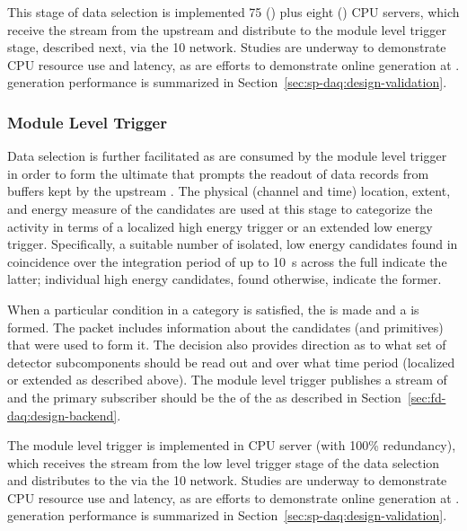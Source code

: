 This stage of data selection is implemented \num{75} () plus eight
() CPU servers, which receive the  stream from the upstream  and distribute  to the module level trigger
stage, described next, via the \SI{10}{\Gbps}  network. Studies are underway to demonstrate CPU
resource use and latency, as are efforts to demonstrate online  generation
at .  generation performance is summarized in
Section~\ref{sec:sp-daq:design-validation}. 


\subsubsection{Module Level Trigger}
\label{sec:daq:mlt}

Data selection is further facilitated as  are consumed
by the module level trigger in order to form the ultimate  that prompts the readout of data records from buffers kept by the upstream . 
The physical (channel and time) location, extent, and energy measure of the
candidates are used at this stage to categorize the activity in terms
of a localized high energy trigger or an extended low energy trigger. 
Specifically, a suitable number of isolated, low energy candidates found in coincidence
over the integration period of up to \SI{10}{\second} across the full 
indicate the latter; individual high energy candidates, found
otherwise, indicate the former.

When a particular condition in a category is satisfied, the  is made and a  is formed. 
The  packet includes information about the candidates (and primitives)
that were used to form it. 
The decision also provides direction as to what set of detector subcomponents
should be read out and over what time period (localized or extended as described above). 
The module level trigger publishes a stream of  and the primary subscriber should be the  of the  as described in Section~\ref{sec:fd-daq:design-backend}.

The module level trigger is implemented in  CPU server (with 100\%
redundancy), which
receives the  stream from the low level trigger stage
of the data selection and distributes  to the
 via the \SI{10}{\Gbps}  network. Studies are
underway to demonstrate CPU resource use and latency, as are
efforts to demonstrate online  generation at .
 generation performance is summarized in
Section~\ref{sec:sp-daq:design-validation}.

